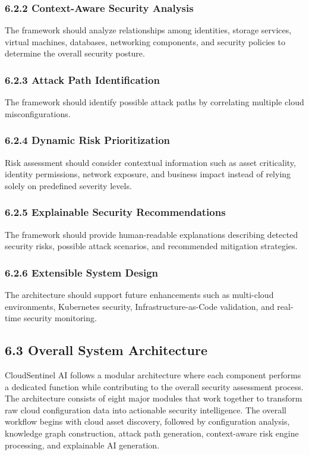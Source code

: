\subsubsection{6.2.2 Context-Aware Security Analysis}
The framework should analyze relationships among identities, storage services, virtual machines, databases, networking components, and security policies to determine the overall security posture.

\subsubsection{6.2.3 Attack Path Identification}
The framework should identify possible attack paths by correlating multiple cloud misconfigurations.

\subsubsection{6.2.4 Dynamic Risk Prioritization}
Risk assessment should consider contextual information such as asset criticality, identity permissions, network exposure, and business impact instead of relying solely on predefined severity levels.

\subsubsection{6.2.5 Explainable Security Recommendations}
The framework should provide human-readable explanations describing detected security risks, possible attack scenarios, and recommended mitigation strategies.

\subsubsection{6.2.6 Extensible System Design}
The architecture should support future enhancements such as multi-cloud environments, Kubernetes security, Infrastructure-as-Code validation, and real-time security monitoring.

\subsection{6.3 Overall System Architecture}

CloudSentinel AI follows a modular architecture where each component performs a dedicated function while contributing to the overall security assessment process. The architecture consists of eight major modules that work together to transform raw cloud configuration data into actionable security intelligence. The overall workflow begins with cloud asset discovery, followed by configuration analysis, knowledge graph construction, attack path generation, context-aware risk engine processing, and explainable AI generation.

